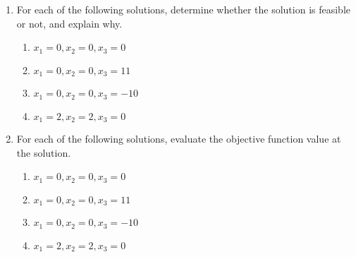 \begin{enumerate}
\begin{enumerate}
  \item For each of the following solutions, determine whether the solution is feasible or not, and
    explain why.
    \begin{multicols}{2}
      \begin{enumerate}
	\item 	\(x_{1}=0,x_{2}=0,x_{3}=0\)
	\item 	\(x_{1}=0,x_{2}=0,x_{3}=11\)
	\item 	\(x_{1}=0,x_{2}=0,x_{3}=-10\)
	\item 	\(x_{1}=2,x_{2}=2,x_{3}=0\)
      \end{enumerate}
    \end{multicols}
  \item For each of the following solutions, evaluate the objective function value at the solution.
    \begin{multicols}{2}
      \begin{enumerate}
	\item 	\(x_{1}=0,x_{2}=0,x_{3}=0\)
	\item 	\(x_{1}=0,x_{2}=0,x_{3}=11\)
	\item 	\(x_{1}=0,x_{2}=0,x_{3}=-10\)
	\item 	\(x_{1}=2,x_{2}=2,x_{3}=0\)
      \end{enumerate}
    \end{multicols}
\end{enumerate}


\end{enumerate}
